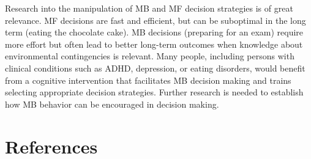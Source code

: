 \documentclass[11pt]{article} %
\begin{document}
Research into the manipulation of MB and MF decision strategies is of great relevance. MF decisions are fast and efficient, but can be suboptimal in the long term (eating the chocolate cake). MB decisions (preparing for an exam) require more effort but often lead to better long-term outcomes when knowledge about environmental contingencies is relevant. Many people, including persons with clinical conditions such as ADHD, depression, or eating disorders, would benefit from a cognitive intervention that facilitates MB decision making and trains selecting appropriate decision strategies. Further research is needed to establish how MB behavior can be encouraged in decision making.

\section{References}

\printbibliography
\end{document}
